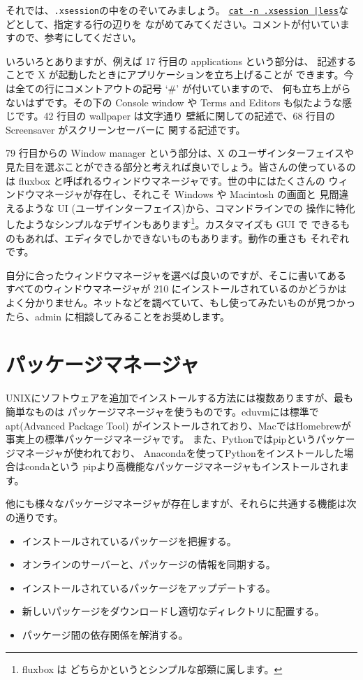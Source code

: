 \documentclass[a4j]{ltjreport}
\begin{document}
    それでは、\verb+.xsession+の中をのぞいてみましょう。
    \underline{\texttt{cat -n .xsession |less}}などとして、指定する行の辺りを
    ながめてみてください。コメントが付いていますので、参考にしてください。

    いろいろとありますが、例えば 17 行目の applications という部分は、
    記述することで X が起動したときにアプリケーションを立ち上げることが
    できます。今は全ての行にコメントアウトの記号 `\#' が付いていますので、
    何も立ち上がらないはずです。その下の Console window や Terms 
    and Editors も似たような感じです。42 行目の wallpaper は文字通り
    壁紙に関しての記述で、68 行目の Screensaver がスクリーンセーバーに
    関する記述です。

    79 行目からの Window manager という部分は、X のユーザインターフェイスや
    見た目を選ぶことができる部分と考えれば良いでしょう。皆さんの使っているの
    は fluxbox と呼ばれるウィンドウマネージャです。世の中にはたくさんの
    ウィンドウマネージャが存在し、それこそ Windows や Macintosh の画面と
    見間違えるような UI (ユーザインターフェイス)から、コマンドラインでの
    操作に特化したようなシンプルなデザインもあります\footnote{fluxbox は
    どちらかというとシンプルな部類に属します。}。カスタマイズも GUI で
    できるものもあれば、エディタでしかできないものもあります。動作の重さも
    それぞれです。

    自分に合ったウィンドウマネージャを選べば良いのですが、そこに書いてある
    すべてのウィンドウマネージャが 210 にインストールされているのかどうかは
    よく分かりません。ネットなどを調べていて、もし使ってみたいものが見つかっ
    たら、admin に相談してみることをお奨めします。

    


    \section{パッケージマネージャ}
    UNIXにソフトウェアを追加でインストールする方法には複数ありますが、最も簡単なものは
    パッケージマネージャを使うものです。eduvmには標準でapt(Advanced Package Tool)
    がインストールされており、MacではHomebrewが事実上の標準パッケージマネージャです。
    また、Pythonではpipというパッケージマネージャが使われており、
    Anacondaを使ってPythonをインストールした場合はcondaという
    pipより高機能なパッケージマネージャもインストールされます。

    他にも様々なパッケージマネージャが存在しますが、それらに共通する機能は次の通りです。
    \begin{itemize}
        \item インストールされているパッケージを把握する。
        \item オンラインのサーバーと、パッケージの情報を同期する。
        \item インストールされているパッケージをアップデートする。
        \item 新しいパッケージをダウンロードし適切なディレクトリに配置する。
        \item パッケージ間の依存関係を解消する。
    \end{itemize}
\end{document}
